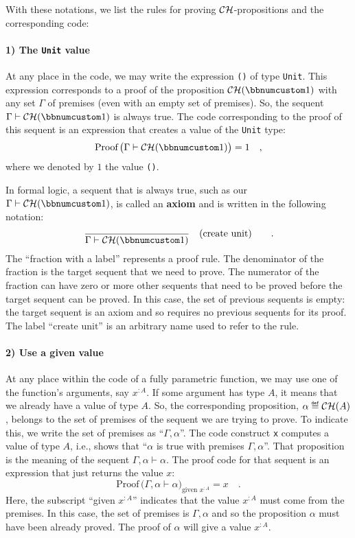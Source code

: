 With these notations, we list the rules for proving ${\cal CH}$-propositions
and the corresponding code:

\paragraph{1) The \texttt{Unit} value}

At any place in the code, we may write the expression \lstinline!()!
of type \lstinline!Unit!. This expression corresponds to a proof
of the proposition ${\cal CH}(\bbnum 1)$ with any set $\Gamma$ of
premises (even with an empty set of premises). So, the sequent $\Gamma\vdash{\cal CH}(\bbnum 1)$
is always true. The code corresponding to the proof of this sequent
is an expression that creates a value of the \lstinline!Unit! type:
\[
\text{Proof}\,\big(\Gamma\vdash{\cal CH}(\bbnum 1)\big)=1\quad,
\]
where we denoted by $1$ the value \lstinline!()!.

In formal logic, a sequent that is always true, such as our $\Gamma\vdash{\cal CH}(\bbnum 1)$,
is called an \textbf{axiom} and is written in
the following notation:
\[
\frac{}{\Gamma\vdash{\cal CH}(\bbnum 1)}\quad(\text{create unit})\quad\quad.
\]
The \textsf{``}fraction with a label\textsf{''} represents a proof rule. The denominator
of the fraction is the target sequent that we need to prove. The numerator
of the fraction can have zero or more other sequents that need to
be proved before the target sequent can be proved. In this case, the
set of previous sequents is empty: the target sequent is an axiom
and so requires no previous sequents for its proof. The label \textsf{``}$\text{create unit}$\textsf{''}
is an arbitrary name used to refer to the rule.

\paragraph{2) Use a given value}

At any place within the code of a fully parametric function, we may
use one of the function\textsf{'}s arguments, say $x^{:A}$. If some argument
has type $A$, it means that we already have a value of type $A$.
So, the corresponding proposition, $\alpha\triangleq{\cal CH}(A)$,
belongs to the set of premises of the sequent we are trying to prove.
To indicate this, we write the set of premises as \textsf{``}$\Gamma,\alpha$\textsf{''}.
The code construct \lstinline!x! computes a value of type $A$, i.e.,
shows that \textsf{``}$\alpha$ is true with premises $\Gamma,\alpha$\textsf{''}.
That proposition is the meaning of the sequent $\Gamma,\alpha\vdash\alpha$.
The proof code for that sequent is an expression that just returns
the value $x$:
\[
\text{Proof}\,\big(\Gamma,\alpha\vdash\alpha\big)_{\text{given }x^{:A}}=x\quad.
\]
Here, the subscript \textsf{``}given $x^{:A}$\textsf{''} indicates that the value
$x^{:A}$ must come from the premises. In this case, the set of premises
is $\Gamma,\alpha$ and so the proposition $\alpha$ must have been
already proved. The proof of $\alpha$ will give a value $x^{:A}$.

